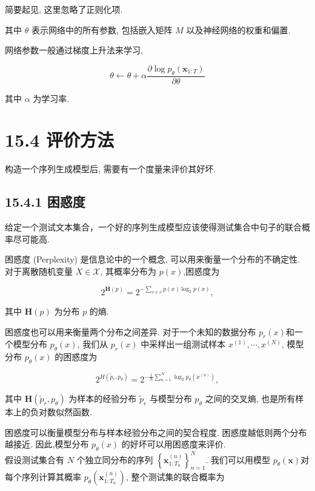\documentclass[10pt]{article}
\begin{document}
简要起见, 这里忽略了正则化项.

其中 $\theta$ 表示网络中的所有参数, 包括嵌入矩阵 $M$ 以及神经网络的权重和偏置.

网络参数一般通过梯度上升法来学习,


\begin{equation*}
\theta \leftarrow \theta+\alpha \frac{\partial \log p_{\theta}\left(\boldsymbol{x}_{1: T}\right)}{\partial \theta} \tag{15.32}
\end{equation*}


其中 $\alpha$ 为学习率.

\section*{15.4 评价方法}
构造一个序列生成模型后, 需要有一个度量来评价其好坏.

\subsection*{15.4.1 困惑度}
给定一个测试文本集合，一个好的序列生成模型应该使得测试集合中句子的联合概率尽可能高.

困惑度 (Perplexity) 是信息论中的一个概念, 可以用来衡量一个分布的不确定性. 对于离散随机变量 $X \in \mathcal{X}$, 其概率分布为 $p(x)$,困惑度为


\begin{equation*}
2^{\boldsymbol{H}(p)}=2^{-\sum_{x \in x} p(x) \log _{2} p(x)}, \tag{15.33}
\end{equation*}


其中 $\boldsymbol{H}(p)$ 为分布 $p$ 的熵.

困惑度也可以用来衡量两个分布之间差异. 对于一个未知的数据分布 $p_{r}(x)$和一个模型分布 $p_{\theta}(x)$, 我们从 $p_{r}(x)$ 中采样出一组测试样本 $x^{(1)}, \cdots, x^{(N)}$, 模型分布 $p_{\theta}(x)$ 的困惑度为


\begin{equation*}
2^{H\left(\tilde{p}_{r}, p_{\theta}\right)}=2^{-\frac{1}{N} \sum_{n=1}^{N} \log _{2} p_{\theta}\left(x^{(n)}\right)}, \tag{15.34}
\end{equation*}


其中 $\boldsymbol{H}\left(\tilde{p}_{r}, p_{\theta}\right)$ 为样本的经验分布 $\tilde{p}_{r}$ 与模型分布 $p_{\theta}$ 之间的交叉熵, 也是所有样本上的负对数似然函数.

困惑度可以衡量模型分布与样本经验分布之间的契合程度. 困惑度越低则两个分布越接近. 因此,模型分布 $p_{\theta}(x)$ 的好坏可以用困惑度来评价.\\
假设测试集合有 $N$ 个独立同分布的序列 $\left\{\boldsymbol{x}_{1: T_{n}}^{(n)}\right\}_{n=1}^{N}$. 我们可以用模型 $p_{\theta}(\boldsymbol{x})$对每个序列计算其概率 $p_{\theta}\left(\boldsymbol{x}_{1: T_{n}}^{(n)}\right)$, 整个测试集的联合概率为
\end{document}
